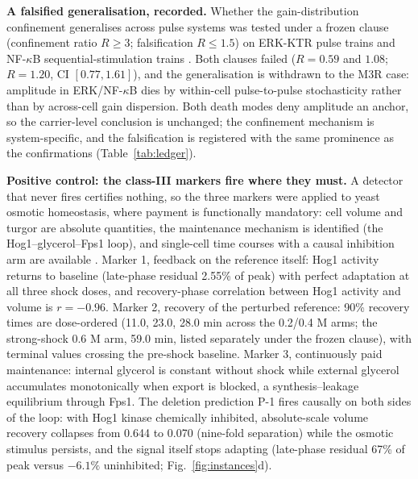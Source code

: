 \documentclass[11pt,a4paper]{article}
\begin{document}
\textbf{A falsified generalisation, recorded.} Whether the gain-distribution confinement generalises across pulse systems was tested under a frozen clause (confinement ratio $R\ge3$; falsification $R\le1.5$) on ERK-KTR pulse trains \cite{Chavez2022} and NF-$\kappa$B sequential-stimulation trains \cite{Wang2022}. Both clauses failed ($R=0.59$ and $1.08$; $R=1.20$, CI $[0.77,1.61]$), and the generalisation is withdrawn to the M3R case: amplitude in ERK/NF-$\kappa$B dies by within-cell pulse-to-pulse stochasticity rather than by across-cell gain dispersion. Both death modes deny amplitude an anchor, so the carrier-level conclusion is unchanged; the confinement mechanism is system-specific, and the falsification is registered with the same prominence as the confirmations (Table~\ref{tab:ledger}).

\textbf{Positive control: the class-III markers fire where they must.} A detector that never fires certifies nothing, so the three markers were applied to yeast osmotic homeostasis, where payment is functionally mandatory: cell volume and turgor are absolute quantities, the maintenance mechanism is identified (the Hog1--glycerol--Fps1 loop), and single-cell time courses with a causal inhibition arm are available \cite{Muzzey2009}. Marker 1, feedback on the reference itself: Hog1 activity returns to baseline (late-phase residual 2.55\% of peak) with perfect adaptation at all three shock doses, and recovery-phase correlation between Hog1 activity and volume is $r=-0.96$. Marker 2, recovery of the perturbed reference: 90\% recovery times are dose-ordered (11.0, 23.0, 28.0 min across the 0.2/0.4 M arms; the strong-shock 0.6 M arm, 59.0 min, listed separately under the frozen clause), with terminal values crossing the pre-shock baseline. Marker 3, continuously paid maintenance: internal glycerol is constant without shock while external glycerol accumulates monotonically when export is blocked, a synthesis--leakage equilibrium through Fps1. The deletion prediction P-1 fires causally on both sides of the loop: with Hog1 kinase chemically inhibited, absolute-scale volume recovery collapses from 0.644 to 0.070 (nine-fold separation) while the osmotic stimulus persists, and the signal itself stops adapting (late-phase residual 67\% of peak versus $-6.1\%$ uninhibited; Fig.~\ref{fig:instances}d).
\end{document}
